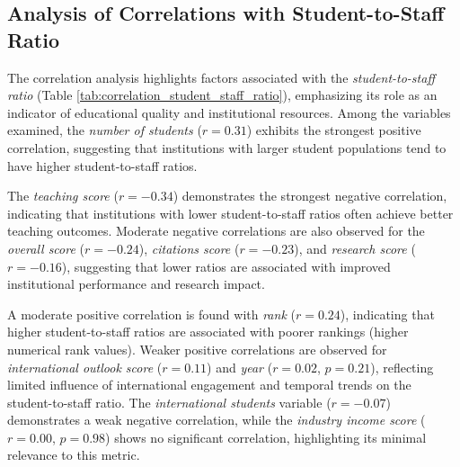 \documentclass[sigconf]{acmart}
\begin{document}
\subsection{Analysis of Correlations with Student-to-Staff Ratio}

The correlation analysis highlights factors associated with the \textit{student-to-staff ratio} (Table \ref{tab:correlation_student_staff_ratio}), emphasizing its role as an indicator of educational quality and institutional resources. Among the variables examined, the \textit{number of students} ($r = 0.31$) exhibits the strongest positive correlation, suggesting that institutions with larger student populations tend to have higher student-to-staff ratios.

The \textit{teaching score} ($r = -0.34$) demonstrates the strongest negative correlation, indicating that institutions with lower student-to-staff ratios often achieve better teaching outcomes. Moderate negative correlations are also observed for the \textit{overall score} ($r = -0.24$), \textit{citations score} ($r = -0.23$), and \textit{research score} ($r = -0.16$), suggesting that lower ratios are associated with improved institutional performance and research impact.

A moderate positive correlation is found with \textit{rank} ($r = 0.24$), indicating that higher student-to-staff ratios are associated with poorer rankings (higher numerical rank values). Weaker positive correlations are observed for \textit{international outlook score} ($r = 0.11$) and \textit{year} ($r = 0.02$, $p = 0.21$), reflecting limited influence of international engagement and temporal trends on the student-to-staff ratio. The \textit{international students} variable ($r = -0.07$) demonstrates a weak negative correlation, while the \textit{industry income score} ($r = 0.00$, $p = 0.98$) shows no significant correlation, highlighting its minimal relevance to this metric.
\end{document}
